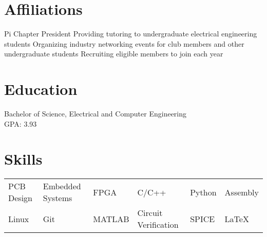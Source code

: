 \documentclass{my_cv}
\begin{document}
\section{Affiliations}

\vspace{-0.75em}
Pi Chapter President
\workitems
    {Providing tutoring to undergraduate electrical engineering students}
    {Organizing industry networking events for club members and other undergraduate students}
    {Recruiting eligible members to join each year}

\section{Education}
\vspace{-0.75em}
Bachelor of Science, Electrical and Computer Engineering \\
GPA: 3.93

\section{Skills}

\noindent\begin{tabular}{@{}l l l l l l}
     PCB Design & Embedded Systems & FPGA & C/C++ & Python &  Assembly\\
    Linux & Git & MATLAB & Circuit Verification & SPICE & \LaTeX\\
\end{tabular}
\end{document}
